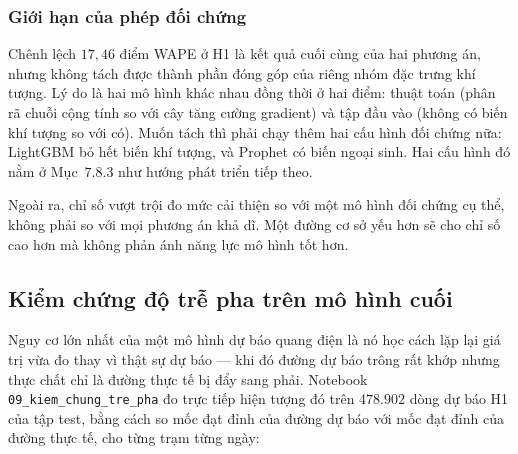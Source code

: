 \documentclass[12pt, a4paper]{report}
\begin{document}
\subsubsection{Giới hạn của phép đối chứng}

Chênh lệch $17{,}46$ điểm WAPE ở H1 là kết quả cuối cùng của hai phương án, nhưng
không tách được thành phần đóng góp của riêng nhóm đặc trưng khí tượng. Lý do là hai
mô hình khác nhau đồng thời ở hai điểm: thuật toán (phân rã chuỗi cộng tính so với cây
tăng cường gradient) và tập đầu vào (không có biến khí tượng so với có). Muốn tách thì phải
chạy thêm hai cấu hình đối chứng nữa: LightGBM bỏ hết biến khí tượng, và Prophet có biến ngoại
sinh. Hai cấu hình đó nằm ở Mục~$7.8.3$ như hướng phát triển tiếp theo.

Ngoài ra, chỉ số vượt trội đo mức cải thiện so với một mô hình đối chứng cụ thể, không
phải so với mọi phương án khả dĩ. Một đường cơ sở yếu hơn sẽ cho chỉ số cao hơn mà không phản
ánh năng lực mô hình tốt hơn.

\FloatBarrier
\subsection{Kiểm chứng độ trễ pha trên mô hình cuối}

Nguy cơ lớn nhất của một mô hình dự báo quang điện là nó học cách lặp lại giá trị vừa đo thay
vì thật sự dự báo --- khi đó đường dự báo trông rất khớp nhưng thực chất chỉ là đường thực tế
bị đẩy sang phải. Notebook \texttt{09\_kiem\_chung\_tre\_pha} đo trực tiếp hiện tượng đó trên
$478.902$ dòng dự báo H1 của tập test, bằng cách so mốc đạt đỉnh của đường dự báo với mốc đạt
đỉnh của đường thực tế, cho từng trạm từng ngày:
\end{document}
